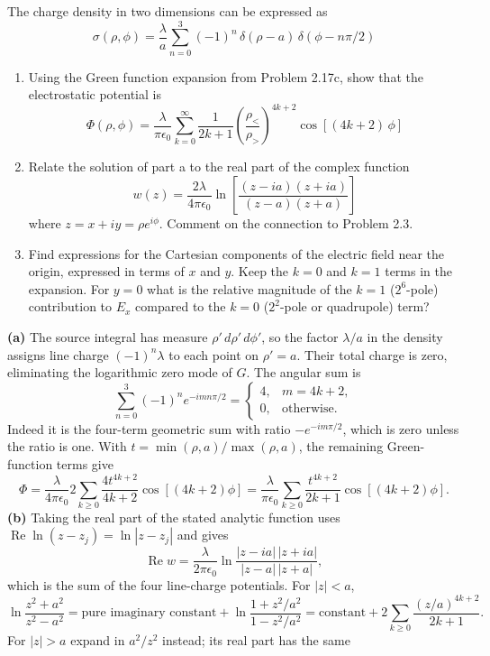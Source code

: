 The charge density in two dimensions can be expressed as
\[
\sigma(\rho,\phi)=\frac{\lambda}{a}\sum_{n=0}^{3}(-1)^{n}\,\delta(\rho-a)\,\delta(\phi-n\pi/2)
\]
\begin{enumerate}
\item[(a)] Using the Green function expansion from Problem 2.17c, show that the electrostatic potential is
\[
\Phi(\rho,\phi)=\frac{\lambda}{\pi\epsilon_{0}}\sum_{k=0}^{\infty}\frac{1}{2k+1}\left(\frac{\rho_{<}}{\rho_{>}}\right)^{4k+2}\cos[(4k+2)\,\phi]
\]
\item[(b)] Relate the solution of part a to the real part of the complex function
\[
w(z)=\frac{2\lambda}{4\pi\epsilon_{0}}\ln\left[\frac{(z-ia)(z+ia)}{(z-a)(z+a)}\right]
\]
where $z=x+iy=\rho e^{i\phi}$. Comment on the connection to Problem 2.3.
\item[(c)] Find expressions for the Cartesian components of the electric field near the origin, expressed in terms of $x$ and $y$. Keep the $k=0$ and $k=1$ terms in the expansion. For $y=0$ what is the relative magnitude of the $k=1$ ($2^{6}$-pole) contribution to $E_{x}$ compared to the $k=0$ ($2^{2}$-pole or quadrupole) term?
\end{enumerate}
\solution
\textbf{(a)} The source integral has measure $\rho'\,d\rho'\,d\phi'$,
so the factor $\lambda/a$ in the density assigns line charge
$(-1)^n\lambda$ to each point on $\rho'=a$. Their total charge is
zero, eliminating the logarithmic zero mode of $G$. The angular sum is
\[
\sum_{n=0}^3(-1)^n e^{-imn\pi/2}
=\begin{cases}4,&m=4k+2,\\0,&\text{otherwise}.
\end{cases}
\]
Indeed it is the four-term geometric sum with ratio $-e^{-im\pi/2}$,
which is zero unless the ratio is one. With
$t=\min(\rho,a)/\max(\rho,a)$, the remaining Green-function terms give
\[
\Phi=\frac{\lambda}{4\pi\epsilon _0}
       2\sum_{k\geq0}\frac{4t^{4k+2}}{4k+2}\cos[(4k+2)\phi]
=\boxed{\frac{\lambda}{\pi\epsilon _0}\sum_{k\geq0}
       \frac{t^{4k+2}}{2k+1}\cos[(4k+2)\phi].}
\]
\textbf{(b)} Taking the real part of the stated analytic function
uses $\operatorname{Re}\ln(z-z_j)=\ln|z-z_j|$ and gives
\[
\operatorname{Re}w=\frac{\lambda}{2\pi\epsilon _0}
 \ln\frac{|z-ia|\,|z+ia|}{|z-a|\,|z+a|},
\]
which is the sum of the four line-charge potentials. For $|z|<a$,
\[
\ln\frac{z^2+a^2}{z^2-a^2}
=\text{pure imaginary constant}
 +\ln\frac{1+z^2/a^2}{1-z^2/a^2}
=\text{constant}+2\sum_{k\geq0}\frac{(z/a)^{4k+2}}{2k+1}.
\]
For $|z|>a$ expand in $a^2/z^2$ instead; its real part has the same
